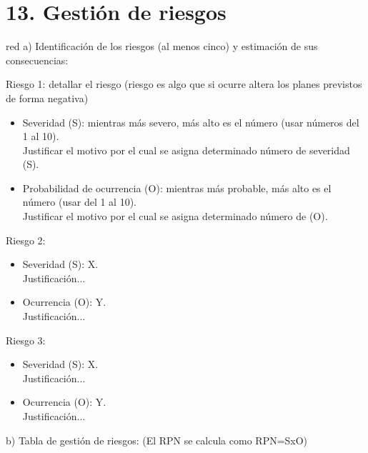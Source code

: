 \documentclass[
    11pt, %
]{charter}
\begin{document}
    \section{13. Gestión de riesgos}
    \label{sec:riesgos}

    \begin{consigna}{red}
        a) Identificación de los riesgos (al menos cinco) y estimación de sus consecuencias:

        Riesgo 1: detallar el riesgo (riesgo es algo que si ocurre altera los planes previstos de forma negativa)
        \begin{itemize}
            \item Severidad (S): mientras más severo, más alto es el número (usar números del 1 al 10).\\
            Justificar el motivo por el cual se asigna determinado número de severidad (S).
            \item Probabilidad de ocurrencia (O): mientras más probable, más alto es el número (usar del 1 al 10).\\
            Justificar el motivo por el cual se asigna determinado número de (O).
        \end{itemize}

        Riesgo 2:
        \begin{itemize}
            \item Severidad (S): X.\\
            Justificación...
            \item Ocurrencia (O): Y.\\
            Justificación...
        \end{itemize}

        Riesgo 3:
        \begin{itemize}
            \item Severidad (S): X.\\
            Justificación...
            \item Ocurrencia (O): Y.\\
            Justificación...
        \end{itemize}


        b) Tabla de gestión de riesgos:      (El RPN se calcula como RPN=SxO)


\end{consigna}
\end{document}
